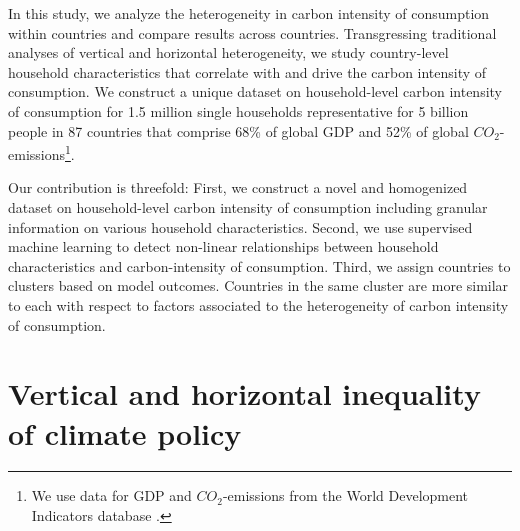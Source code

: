 \documentclass[12pt, a4paper]{article}
\begin{document}

In this study, we analyze the heterogeneity in carbon intensity of consumption within countries and compare results across countries. Transgressing traditional analyses of vertical and horizontal heterogeneity, we study country-level household characteristics that correlate with and drive the carbon intensity of consumption. We construct a unique dataset on household-level carbon intensity of consumption for 1.5 million single households representative for 5 billion people in 87 countries that comprise 68\% of global GDP and 52\% of global $CO_{2}$-emissions\footnote{We use data for GDP and $CO_{2}$-emissions from the World Development Indicators database \autocite{WorldBankGroup.2023}.}.



Our contribution is threefold: First, we construct a novel and homogenized dataset on household-level carbon intensity of consumption including granular information on various household characteristics. Second, we use supervised machine learning to detect non-linear relationships between household characteristics and carbon-intensity of consumption. Third, we assign countries to clusters based on model outcomes. Countries in the same cluster are more similar to each with respect to factors associated to the heterogeneity of carbon intensity of consumption. 




\section{Vertical and horizontal inequality of climate policy} \label{sec:literature}
\end{document}
